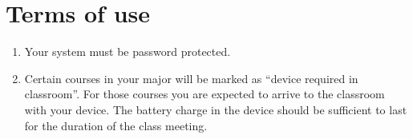 \section{Terms of use}

\begin{enumerate}
    \item Your system must be password protected.
    
    \item Certain courses in your major will be marked as ``device required in classroom''. For those courses you are expected to arrive to the classroom with your device. The battery charge in the device should be sufficient to last for the duration of the class meeting.

\end{enumerate}
